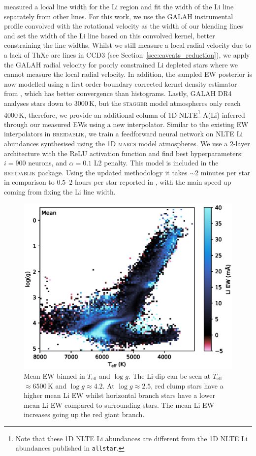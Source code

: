 \documentclass[
  journal=pasa,
  manuscript=research-paper, %
  year=2024,
  volume=37
]{cup-journal}
\newcommand{\Teff}{$T_\mathrm{eff}$\xspace}
\newcommand{\logg}{$\log g$\xspace}
\newcommand{\marcs}{\textsc{marcs}\xspace}
\newcommand{\breidablik}{\textsc{breidablik}\xspace}
\newcommand{\stagger}{\textsc{stagger}\xspace}
\begin{document}
\citet{Wang2024} measured a local line width for the Li region and fit the width of the Li line separately from other lines. For this work, we use the GALAH instrumental profile convolved with the rotational velocity as the width of our blending lines and set the width of the Li line based on this convolved kernel, better constraining the line widths. 
Whilst we still measure a local radial velocity due to a lack of ThXe arc lines in CCD3 (see Section~\ref{sec:caveats_reduction}), we apply the GALAH radial velocity for poorly constrained Li depleted stars where we cannot measure the local radial velocity. In addition, the sampled EW posterior is now modelled using a first order boundary corrected kernel density estimator from \citet{Lewis2019}, which has better convergence than histograms. Lastly, GALAH DR4 analyses stars down to 3000\,K, but the \stagger model atmospheres only reach 4000\,K, therefore, we provide an additional column of 1D NLTE\footnote{Note that these 1D NLTE Li abundances are different from the 1D NLTE Li abundances published in \texttt{allstar}.} A(Li) inferred through our measured EWs using a new interpolator. Similar to the existing EW interpolators in \breidablik \citep{Wang2021}, we train a feedforward neural network on NLTE Li abundances synthesised using the 1D \marcs model atmospheres. We use a 2-layer architecture with the ReLU activation function and find best hyperparameters: $i = 900$ neurons, and $\alpha = 0.1$ L2 penalty. This model is included in the \breidablik package.
Using the updated methodology it takes $\sim$2 minutes per star in comparison to $0.5$--$2$ hours per star reported in \citet{Wang2024}, with the main speed up coming from fixing the Li line width. 

\begin{figure}[ht]
\includegraphics[width=\columnwidth]{figures/mean_ew.eps}
\caption{
Mean EW binned in \Teff and \logg. The Li-dip can be seen at \Teff$\approx 6500$\,K and \logg$\approx 4.2$. At \logg$\approx 2.5$, red clump stars have a higher mean Li EW whilst horizontal branch stars have a lower mean Li EW compared to surrounding stars. The mean Li EW increases going up the red giant branch. 
}
\label{fig:mean_ew}
\end{figure}
\end{document}
